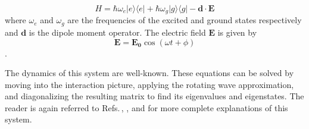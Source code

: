 \begin{equation}
H = \hbar \omega_e |e\rangle\langle e| + \hbar \omega_g |g\rangle\langle g| - \mathbf{d}\cdot\mathbf{E}
\end{equation}  
where $\omega_e$ and $\omega_g$ are the frequencies of the excited and ground states respectively and $\mathbf{d}$ is the dipole moment operator. The electric field $\mathbf{E}$ is given by 
\begin{equation}
\mathbf{E} = \mathbf{E_0} \cos (\omega t + \phi)
\end{equation}
\cite{Young1997363}. 

The dynamics of this system are well-known. These equations can be solved by moving into the interaction picture, applying the rotating wave approximation, and diagonalizing the resulting matrix to find its eigenvalues and eigenstates. The reader is again referred to Refs.\,\cite{cohenTannoudji}, \cite{demilleBudkerKimball}, and \cite{Young1997363} for more complete explanations of this system. 

